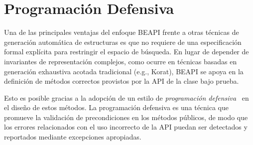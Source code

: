 
\section{Programación Defensiva}
\label{sec:defensiveProgramming}

Una de las principales ventajas del enfoque \textsf{BEAPI} frente a otras técnicas de generación automática de estructuras 
es que no requiere de una especificación formal explícita para restringir el espacio de búsqueda. 
En lugar de depender de invariantes de representación complejos, como ocurre en técnicas basadas en generación exhaustiva acotada tradicional 
(e.g., \textsf{Korat}), \textsf{BEAPI} se apoya en la definición de métodos correctos provistos por la API de la clase bajo prueba.

Esto es posible gracias a la adopción de un estilo de \emph{programación defensiva}~\cite{Liskov00} en el diseño de estos métodos. 
La programación defensiva es una técnica que promueve la validación de precondiciones en los métodos públicos, de modo que los errores 
relacionados con el uso incorrecto de la API puedan ser detectados y reportados mediante excepciones apropiadas.


